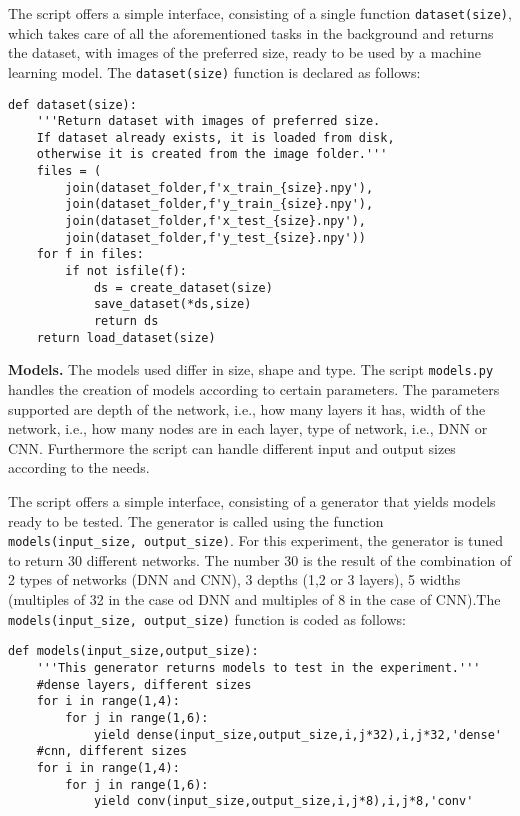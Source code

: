 The script offers a simple interface, consisting of a single function \texttt{dataset(size)}, which takes care of all the aforementioned tasks in the background and returns the dataset, with images of the preferred size, ready to be used by a machine learning model. The \texttt{dataset(size)} function is declared as follows:
\begin{verbatim}
def dataset(size):
    '''Return dataset with images of preferred size.
    If dataset already exists, it is loaded from disk,
    otherwise it is created from the image folder.'''
    files = (
        join(dataset_folder,f'x_train_{size}.npy'),
        join(dataset_folder,f'y_train_{size}.npy'),
        join(dataset_folder,f'x_test_{size}.npy'),
        join(dataset_folder,f'y_test_{size}.npy'))
    for f in files:
        if not isfile(f):
            ds = create_dataset(size)
            save_dataset(*ds,size)
            return ds
    return load_dataset(size)
\end{verbatim}

\textbf{Models.}
The models used differ in size, shape and type. The script \texttt{models.py} handles the creation of models according to certain parameters. The parameters supported are depth of the network, i.e., how many layers it has, width of the network, i.e., how many nodes are in each layer, type of network, i.e., DNN or CNN. Furthermore the script can handle different input and output sizes according to the needs.

The script offers a simple interface, consisting of a generator that yields models ready to be tested. The generator is called using the function \texttt{models(input\_size, output\_size)}. For this experiment, the generator is tuned to return 30 different networks. The number 30 is the result of the combination of 2 types of networks (DNN and CNN), 3 depths (1,2 or 3 layers), 5 widths (multiples of 32 in the case od DNN and multiples of 8 in the case of CNN).The \texttt{models(input\_size, output\_size)} function is coded as follows:
\begin{verbatim}
def models(input_size,output_size):
    '''This generator returns models to test in the experiment.'''
    #dense layers, different sizes
    for i in range(1,4):
        for j in range(1,6):
            yield dense(input_size,output_size,i,j*32),i,j*32,'dense'
    #cnn, different sizes
    for i in range(1,4):
        for j in range(1,6):
            yield conv(input_size,output_size,i,j*8),i,j*8,'conv'
\end{verbatim}

